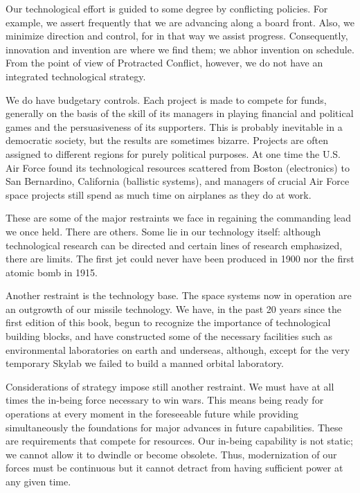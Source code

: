Our technological effort is guided to some degree by conflicting policies. For example, we assert frequently that we are advancing along a board front. Also, we minimize direction and control, for in that way we assist progress. Consequently, innovation and invention are where we find them; we abhor invention on schedule. From the point of view of Protracted Conflict, however, we do not have an integrated technological strategy.

We do have budgetary controls. Each project is made to compete for funds, generally on the basis of the skill of its managers in playing financial and political games and the persuasiveness of its supporters. This is probably inevitable in a democratic society, but the results are sometimes bizarre. Projects are often assigned to different regions for purely political purposes. At one time the U.S. Air Force found its technological resources scattered from Boston (electronics) to San Bernardino, California (ballistic systems), and managers of crucial Air Force space projects still spend as much time on airplanes as they do at work.

These are some of the major restraints we face in regaining the commanding lead we once held. There are others. Some lie in our technology itself: although technological research can be directed and certain lines of research emphasized, there are limits. The first jet could never have been produced in 1900 nor the first atomic bomb in 1915.

Another restraint is the technology base. The space systems now in operation are an outgrowth of our missile technology. We have, in the past 20 years since the first edition of this book, begun to recognize the importance of technological building blocks, and have constructed some of the necessary facilities such as environmental laboratories on earth and underseas, although, except for the very temporary Skylab we failed to build a manned orbital laboratory.

Considerations of strategy impose still another restraint. We must have at all times the in-being force necessary to win wars. This means being ready for operations at every moment in the foreseeable future while providing simultaneously the foundations for major advances in future capabilities. These are requirements that compete for resources. Our in-being capability is not static; we cannot allow it to dwindle or become obsolete. Thus, modernization of our forces must be continuous but it cannot detract from having sufficient power at any given time.

